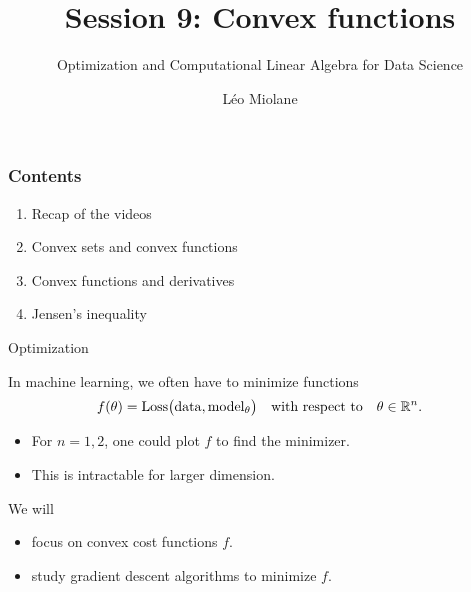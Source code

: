\documentclass{beamer}
\title{Session 9: Convex functions}
\subtitle{Optimization and Computational Linear Algebra for Data Science}
\author{Léo Miolane}
\date{}
\begin{document}
\setcounter{showProgressBar}{0}
\setcounter{showSlideNumbers}{0}

\frame{\titlepage}
\setcounter{framenumber}{0}
\setcounter{showSlideNumbers}{1}

\begin{frame}
	\frametitle{Contents}
	\begin{enumerate}
		\item Recap of the videos
		\item Convex sets and convex functions
		\item Convex functions and derivatives
		\item Jensen's inequality
	\end{enumerate}
\end{frame}
\begin{frame}[t]{Optimization}
	\grid

	In machine learning, we often have to minimize functions
	$$
	f(\theta) = {\rm Loss}\big( {\rm data}, {\rm model}_{\theta}\big)
	\quad \text{with respect to} \quad \theta \in \mathbb{R}^n.
	$$
	\begin{itemize}
		\item For $n=1,2$, one could plot $f$ to find the minimizer.
		\item This is intractable for larger dimension.
	\end{itemize}

	\vspace{0.2cm}
	\begin{block}{We will}
		\begin{itemize}
			\item focus on convex cost functions $f$.
			\item study gradient descent algorithms to minimize $f$.
		\end{itemize}
	\end{block}
\end{frame}
\end{document}
